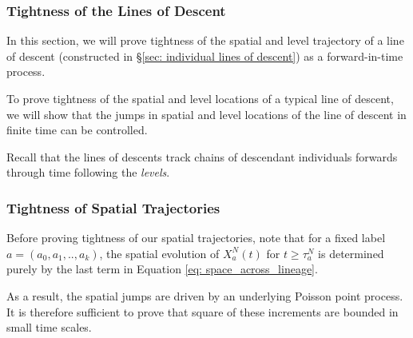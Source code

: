 \documentclass[12pt]{article}
\begin{document}
\subsubsection{Tightness of the Lines of Descent}
    \label{sec:lookdown_tightness_proofs}

In this section,
we will prove tightness
of the spatial and level trajectory
of a line of descent
(constructed in \S \ref{sec: individual lines of descent})
as a forward-in-time process.

To prove tightness of the 
spatial and level locations
of a typical line of descent,
we will show that the
jumps in
spatial and level locations
of the line of descent
in finite time
can be controlled.

Recall that the lines of descents
track chains of descendant
individuals forwards through time following the \textit{levels}.

\subsubsection{Tightness of Spatial Trajectories}
Before proving tightness of our spatial trajectories, 
note that for a fixed label
$a=(a_0,a_1,..,a_k)$,
the spatial evolution of 
$X^N_{a}(t)$ for $t \geq \tau^N_{a}$
is determined
purely by the last term 
in Equation \eqref{eq: space_across_lineage}.

As a result, the spatial jumps are 
driven by 
an underlying Poisson point process. 
It is therefore sufficient
to prove that square of 
these increments are bounded
in small time scales.
\end{document}
